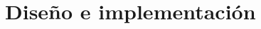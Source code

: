 \documentclass[a4paper, 12pt]{book}
\begin{document}

\cleardoublepage
\chapter{Diseño e implementación}
\label{sec:diseno}










 
\end{document}
